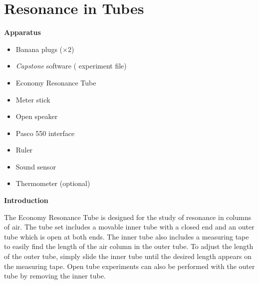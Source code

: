 \section{Resonance in Tubes} 
\label{resonance_in_tubes}



\makelabheader %

\medskip

%
%
%

\medskip
\textbf{Apparatus} 
\begin{itemize}[nosep]
\item Banana plugs ($\times 2$)
\item \textit{Capstone} software ( experiment file)
\item Economy Resonance Tube 
\item Meter stick
\item Open speaker
\item Pasco 550 interface
\item Ruler
\item Sound sensor
\item Thermometer (optional)
\end{itemize}
\medskip
\textbf{Introduction} 

The Economy Resonance Tube is designed for the study of resonance in columns of air.  The tube set includes a movable inner tube with a closed end and an outer tube which is open at both ends.  The inner tube also includes a measuring tape to easily find the length of the air column in the outer tube.  To adjust the length of the outer tube, simply slide the inner tube until the desired length appears on the measuring tape.  Open tube experiments can also be performed with the outer tube by removing the inner tube.

